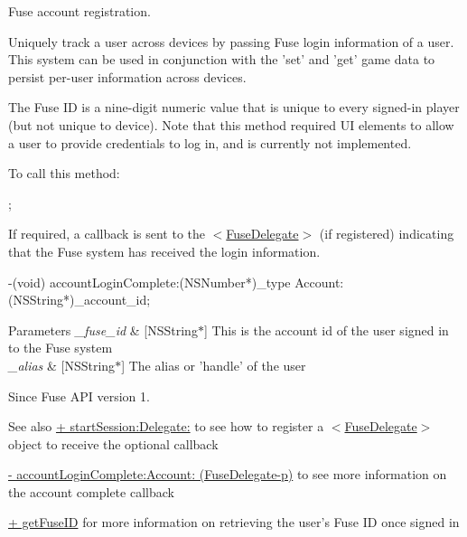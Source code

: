 Fuse account registration. 

Uniquely track a user across devices by passing Fuse login information of a user. This system can be used in conjunction with the 'set' and 'get' game data to persist per-\/user information across devices.

The Fuse I\+D is a nine-\/digit numeric value that is unique to every signed-\/in player (but not unique to device). Note that this method required U\+I elements to allow a user to provide credentials to log in, and is currently not implemented.

To call this method\+:


\begin{DoxyCode}
;
\end{DoxyCode}


If required, a callback is sent to the $<$\hyperlink{protocol_fuse_delegate-p}{Fuse\+Delegate}$>$ (if registered) indicating that the Fuse system has received the login information.


\begin{DoxyCode}
-(void) accountLoginComplete:(NSNumber*)\_type Account:(NSString*)\_account\_id;
\end{DoxyCode}



\begin{DoxyParams}{Parameters}
{\em \+\_\+fuse\+\_\+id} & \mbox{[}N\+S\+String$\ast$\mbox{]} This is the account id of the user signed in to the Fuse system \\
\hline
{\em \+\_\+alias} & \mbox{[}N\+S\+String$\ast$\mbox{]} The alias or 'handle' of the user \\
\hline
\end{DoxyParams}
\begin{DoxySince}{Since}
Fuse A\+P\+I version 1. 
\end{DoxySince}
\begin{DoxySeeAlso}{See also}
\hyperlink{interface_fuse_a_p_i_aab1649c81002a336ca872da6fef36b8d}{+ start\+Session\+:\+Delegate\+:} to see how to register a $<$\hyperlink{protocol_fuse_delegate-p}{Fuse\+Delegate}$>$ object to receive the optional callback 

\hyperlink{protocol_fuse_delegate-p_a54a18530604a7ceeb0e9419fc7fa3345}{-\/ account\+Login\+Complete\+:\+Account\+: (\+Fuse\+Delegate-\/p)} to see more information on the account complete callback 

\hyperlink{interface_fuse_a_p_i_ab483c2a3f4439aad8e19200cf24ff731}{+ get\+Fuse\+I\+D} for more information on retrieving the user's Fuse I\+D once signed in 
\end{DoxySeeAlso}
\hypertarget{interface_fuse_a_p_i_a02a3bc5562d4f6e50bac5339f4ac4046}{}
